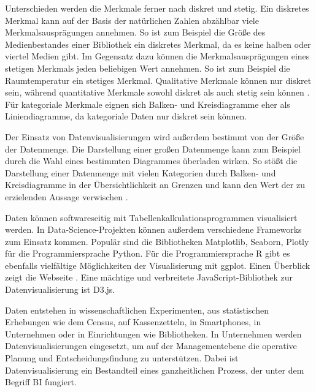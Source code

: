 Unterschieden werden die Merkmale ferner nach diskret und stetig.
Ein diskretes Merkmal kann auf der Basis der natürlichen Zahlen abzählbar viele Merkmalsausprägungen annehmen.
So ist zum Beispiel die Größe des Medienbestandes einer Bibliothek ein diskretes Merkmal, da es keine halben oder viertel Medien gibt.
Im Gegensatz dazu können die Merkmalsausprägungen eines stetigen Merkmals jeden beliebigen Wert annehmen. So ist zum Beispiel die Raumtemperatur ein stetiges Merkmal.
Qualitative Merkmale können nur diskret sein, während quantitative Merkmale sowohl diskret als auch stetig sein können \cite[vgl.][102 f.]{kirk_data_2019}. 
Für kategoriale Merkmale eignen sich Balken- und Kreisdiagramme eher als Liniendiagramme, da kategoriale Daten nur diskret sein können.

Der Einsatz von Datenvisualisierungen wird außerdem bestimmt von der Größe der Datenmenge.
Die Darstellung einer großen Datenmenge kann zum Beispiel durch die Wahl eines bestimmten Diagrammes überladen wirken. 
So stößt die Darstellung einer Datenmenge mit vielen Kategorien durch Balken- und Kreisdiagramme 
in der Übersichtlichkeit an Grenzen und kann den Wert der zu erzielenden Aussage verwischen \cite[Vgl.][5 ff.]{few_show_2012}. 

Daten können softwareseitig mit Tabellenkalkulationsprogrammen visualisiert werden.
In Data-Science-Projekten können außerdem verschiedene Frameworks zum Einsatz kommen. Populär sind die Bibliotheken Matplotlib, Seaborn, Plotly für 
die Programmiersprache Python. Für die Programmiersprache R gibt es ebenfalls vielfältige Möglichkeiten der Visualisierung mit
ggplot. Einen Überblick zeigt die Webseite \cite{witherley_chartmaker_2020}.
Eine mächtige und verbreitete JavaScript-Bibliothek zur Datenvisualisierung ist D3.js.


Daten entstehen in wissenschaftlichen Experimenten, aus statistischen Erhebungen wie 
dem Census, auf Kassenzetteln, in Smartphones, in Unternehmen oder in Einrichtungen wie Bibliotheken. 
In Unternehmen werden Datenvisualisierungen eingesetzt, um auf der Managementebene die operative Planung und Entscheidungsfindung zu unterstützen.
Dabei ist Datenvisualisierung ein Bestandteil eines ganzheitlichen Prozess, der unter dem Begriff \acrfull{BI} fungiert. 


